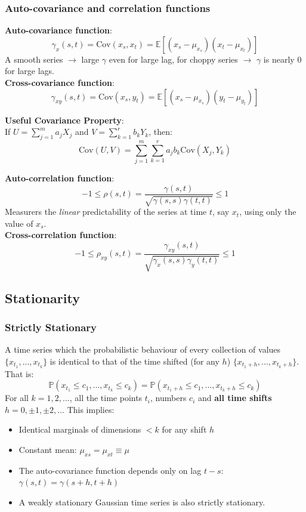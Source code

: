 \documentclass[11pt]{article}
\newcommand{\noi}{\noindent}
\begin{document}
\subsubsection{Auto-covariance and correlation functions}
\noi \textbf{Auto-covariance function}:
$$\gamma_x(s, t) = \text{Cov}(x_s, x_t) = \mathbb{E}[(x_s - \mu_{x_s})(x_t - \mu_{x_t})]$$
\noi A smooth series $\rightarrow$ large $\gamma$ even for large lag, for choppy series $\rightarrow$ $\gamma$ is nearly $0$ for large lags. \\

\noi \textbf{Cross-covariance function}:
$$\gamma_{xy}(s, t) = \text{Cov}(x_s, y_t) = \mathbb{E}[(x_s - \mu_{x_s})(y_t - \mu_{y_t})]$$

\noi \textbf{Useful Covariance Property}: \\
\noi If $U = \sum_{j=1}^m{a_jX_j}$ and $V = \sum_{k=1}^r{b_kY_k}$, then:
$$\text{Cov}(U, V) = \sum_{j=1}^{m}{\sum_{k=1}^{r}}{a_jb_k\text{Cov}(X_j, Y_k)}$$

\noi \textbf{Auto-correlation function}:
$$-1 \leq \rho(s,t) = \frac{\gamma(s,t)}{\sqrt{\gamma(s,s)\gamma(t,t)}} \leq 1$$
\noi Measurers the \textit{linear} predictability of the series at time $t$, say $x_t$, using only the value of $x_s$. \\

\noi \textbf{Cross-correlation function}:
$$-1 \leq \rho_{xy}(s,t) = \frac{\gamma_{xy}(s,t)}{\sqrt{\gamma_{x}(s,s)\gamma_y(t,t)}} \leq 1$$


\subsection{Stationarity}
\subsubsection{Strictly Stationary}
\noindent A time series which the probabilistic behaviour of every collection of values $\{x_{t_1}, ..., x_{t_k}\}$ is identical to that of the time shifted (for any $h$) $\{x_{t_1+h},...,x_{t_k+h}\}$. That is:
$$\mathbb{P}(x_{t_1} \leq c_1, ..., x_{t_k} \leq c_k) = \mathbb{P}(x_{t_1+h} \leq c_1,...,x_{t_k+h} \leq c_k)$$
\noindent For all $k=1,2,...$, all the time points $t_i$, numbers $c_i$ and \textbf{all time shifts} $h=0, \pm 1, \pm2,...$ This implies:
\begin{itemize}
    \item Identical marginals of dimensions $< k$ for any shift $h$
    \item Constant mean: $\mu_{xs} = \mu_{xt} \equiv \mu$
    \item The auto-covariance function depends only on lag $t-s$: $\gamma(s,t) = \gamma(s+h, t+h)$
    \item A weakly stationary Gaussian time series is also strictly stationary.
\end{itemize}
\end{document}
